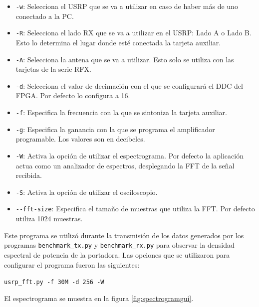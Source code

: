 \begin{itemize}
  \item \verb|-w|: Selecciona el USRP que se va a utilizar en caso de haber m\'as de uno conectado a
  la PC.
  \item \verb|-R|: Selecciona el lado RX que se va a utilizar en el USRP: Lado A o Lado B. Esto lo
  determina el lugar donde est\'e conectada la tarjeta auxiliar.
  \item \verb|-A|: Selecciona la antena que se va a utilizar. Esto solo se utiliza con las tarjetas
  de la serie RFX.
  \item \verb|-d|: Selecciona el valor de decimaci\'on con el que se configurar\'a el DDC del FPGA.
  Por defecto lo configura a 16.
  \item \verb|-f|: Especifica la frecuencia con la que se sintoniza la tarjeta auxiliar.
  \item \verb|-g|: Especifica la ganancia con la que se programa el amplificador programable. Los
  valores son en decibeles.
  \item \verb|-W|: Activa la opci\'on de utilizar el espectrograma. Por defecto la aplicaci\'on actua
  como un analizador de espectros, desplegando la FFT de la se\~nal recibida.
  \item \verb|-S|: Activa la opci\'on de utilizar el osciloscopio.
  \item \verb|--fft-size|: Especifica el tama\~no de muestras que utiliza la FFT. Por defecto
  utiliza 1024 muestras.
\end{itemize} 

Este programa se utiliz\'o durante la transmisi\'on de los datos generados por los programas
\verb|benchmark_tx.py| y \verb|benchmark_rx.py| para observar la densidad espectral de potencia de
la portadora. Las opciones que se utilizaron para configurar el programa fueron las siguientes:

\begin{center}
\verb|usrp_fft.py -f 30M -d 256 -W|
\end{center}

El espectrograma se muestra en la figura \ref{fig:spectrogramgui}.

